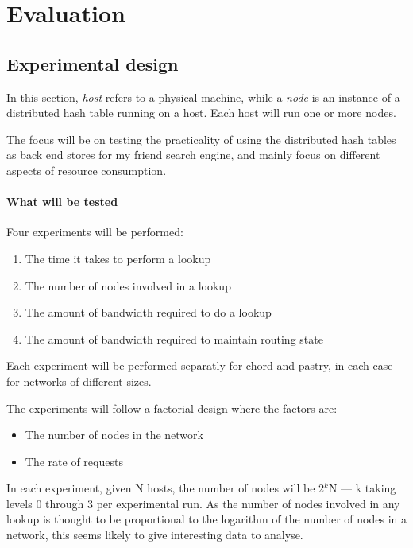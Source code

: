 
\section{Evaluation}
\subsection{Experimental design}
In this section, \textit{host} refers to a physical machine, while a \textit{node} is an instance of a distributed hash table running on a host. Each host will run one or more nodes.

The focus will be on testing the practicality of using the distributed hash tables as back end stores for my friend search engine, and mainly focus on different aspects of resource consumption.

\paragraph{What will be tested}
Four experiments will be performed: 

\begin{enumerate}
\item The time it takes to perform a lookup
\item The number of nodes involved in a lookup
\item The amount of bandwidth required to do a lookup
\item The amount of bandwidth required to maintain routing state
\end{enumerate}

Each experiment will be performed separatly for chord and pastry, in each case for networks of different sizes.

The experiments will follow a factorial design where the factors are:
\begin{itemize}
\item The number of nodes in the network
\item The rate of requests
\end{itemize}

In each experiment, given N hosts, the number of nodes will be 2$^{k}$N --- k taking levels 0 through 3 per experimental run. As the number of nodes involved in any lookup is thought to be proportional to the logarithm of the number of nodes in a network, this seems likely to give interesting data to analyse.

